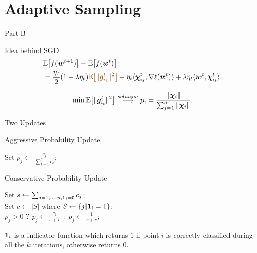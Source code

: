\section{Adaptive Sampling}
\begin{frame}{Part B}
\Large \center{\color{blue}{Adaptive Sampling Algorithms}}
\end{frame}

\begin{frame}{Idea behind SGD}
\begin{align*}
 &\E\big[f(\wv^{t+1})\big] - \E\big[f(\wv^{t})\big] \\
   &= \frac{\eta_t}{2}(1+\lambda \eta_t){\color{red}{\E\big[\|\gv_{i_t}^t\|^2\big]}} - \eta_t \langle \chiv_{i_t}^t, \nabla \ell(\wv^{t})\rangle + \lambda \eta_t \langle \wv^{t}, \chiv_{i_t}^t \rangle.
\end{align*}

\begin{equation*}\label{eq:p_optimal}
\min \mathbb{E}\big[\|\bm{g}_{i_t}^t\|^2\big]
   \overset{solution}{\longrightarrow} p_i = \frac{\|\bm{\chi}_i\|}{\sum_{j=1}^n \|\bm{\chi}_i\|}.
\end{equation*}

\end{frame}

\begin{frame}{Two Updates}
\begin{algorithm}[H]
    \label{alg:AggUpdate}
    \caption{Aggressive Probability Update}
    \SetAlgoLined
     {
	Set $p_j \leftarrow \frac{c_j}{\sum_{k=1}^n c_k}$;
    }
    \end{algorithm}
\begin{algorithm}[H]    
    \label{alg:ConUpdate}
    \caption{Conservative Probability Update}
    \SetAlgoLined
    Set $s \leftarrow \sum_{j=1,\dots, n, \bm{1}_i=\texttt{0}} c_j$; \\
    Set $c \leftarrow |S|$ where $S \leftarrow \{j | \bm{1}_i=\texttt{1}\}$; \\
     {
	    $p_j>0$ $?$ {$p_j \leftarrow \frac{c_j}{s+c}$} $\colon$ {$p_j \leftarrow \frac{1}{s+c}$; } 
    } 
\end{algorithm} 
\Tiny $\bm{1}_i$ is a indicator function which returns $1$ if point $i$ is correctly classified during all the $k$ iterations, otherwise returns $0$.
\end{frame}


